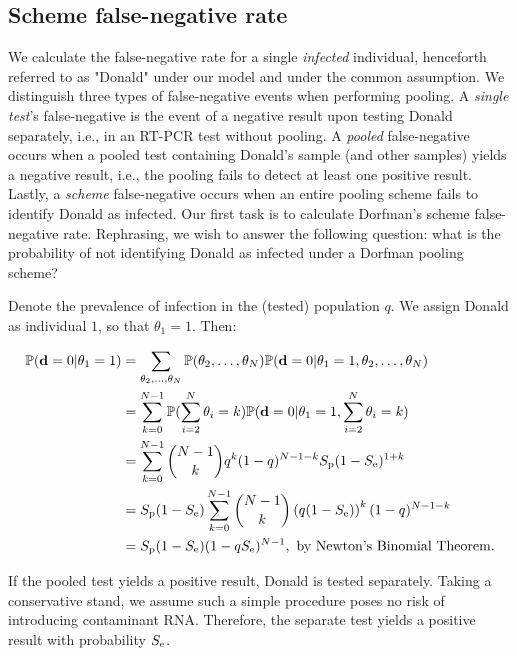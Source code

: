 \documentclass{article}
\begin{document}
\subsection{Scheme false-negative rate}
We calculate the false-negative rate for a single \emph{infected}
individual, henceforth referred to as "Donald" under our model and
under the common assumption. We distinguish three types of
false-negative events when performing pooling. A \emph{single test}'s
false-negative is the event of a negative result upon testing Donald
separately, i.e., in an RT-PCR test without pooling. A \emph{pooled}
false-negative occurs when a pooled test containing Donald's sample
(and other samples) yields a negative result, i.e., the pooling fails
to detect at least one positive result. Lastly, a \emph{scheme}
false-negative occurs when an entire pooling scheme fails to identify
Donald as infected. Our first task is to calculate Dorfman's scheme
false-negative rate. Rephrasing, we wish to answer the following
question: what is the probability of not identifying Donald as
infected under a Dorfman pooling scheme?

Denote the prevalence of infection in the (tested) population $q$. We
assign Donald as individual $1$, so that $\theta_1=1$. Then:

\begin{align}
  \begin{split}
    \mathbb{P}(\mathbf{d}=0|\theta_1=1) &= \sum_{\theta_2,\dots,\theta_N}
    \mathbb{P}(\theta_2,\dots,\theta_N)
    \mathbb{P}(\mathbf{d}=0|\theta_1=1,\theta_2,\dots,\theta_N) \\
    &= \sum_{k=0}^{N-1}\mathbb{P}(\sum_{i=2}^N\theta_i=k)
    \mathbb{P}(\mathbf{d}=0|\theta_1=1,\sum_{i=2}^N\theta_i = k)\\
    &= \sum_{k=0}^{N-1}\binom{N-1}{k}q^k(1-q)^{N-1-k} S_\text{p}(1-S_\text{e})^{1+k}\\
    &= S_\text{p}(1-S_\text{e}) \sum_{k=0}^{N-1}\binom{N-1}{k}
    \left(q(1-S_\text{e})\right)^k(1-q)^{N-1-k}\\
    &= S_\text{p}(1-S_\text{e})(1-qS_\text{e})^{N-1}, \text{ by Newton's Binomial Theorem.} \\
  \end{split}
\end{align}

If the pooled test yields a positive result, Donald is tested
separately. Taking a conservative stand, we assume such a simple
procedure poses no risk of introducing contaminant RNA. Therefore, the
separate test yields a positive result with probability $S_\text{e}$.
\end{document}
